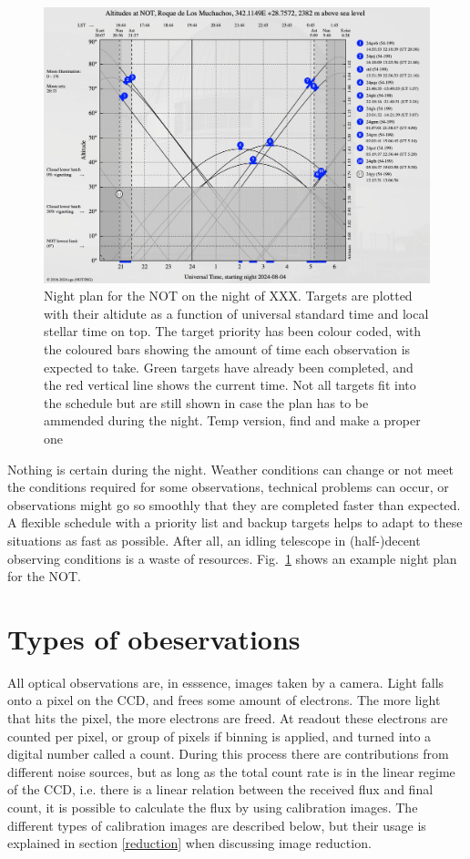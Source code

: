\documentclass[a4paper,oneside,12pt, class=Latex/Classes/PhDthesisPSnPDF, crop=false]{standalone}
\begin{document}
\begin{figure}
    \centering
    \includegraphics[width=\textwidth]{../Images/chapter_2/visplot.png}
    \caption{Night plan for the NOT on the night of XXX. Targets are plotted with their altidute as a function of universal standard time and local stellar time on top. The target priority has been colour coded, with the coloured bars showing the amount of time each observation is expected to take. Green targets have already been completed, and the red vertical line shows the current time. Not all targets fit into the schedule but are still shown in case the plan has to be ammended during the night.\color{red} Temp version, find and make a proper one \color{black}}
    \label{visplot}
\end{figure}

Nothing is certain during the night. Weather conditions can change or not meet the conditions required for some observations, technical problems can occur, or observations might go so smoothly that they are completed faster than expected. A flexible schedule with a priority list and backup targets helps to adapt to these situations as fast as possible. After all, an idling telescope in (half-)decent observing conditions is a waste of resources. Fig.~\ref{visplot} shows an example night plan for the NOT.



\section{Types of obeservations}
All optical observations are, in esssence, images taken by a camera. Light falls onto a pixel on the CCD, and frees some amount of electrons. The more light that hits the pixel, the more electrons are freed. At readout these electrons are counted per pixel, or group of pixels if binning is applied, and turned into a digital number called a count. During this process there are contributions from different noise sources, but as long as the total count rate is in the linear regime of the CCD, i.e. there is a linear relation between the received flux and final count, it is possible to calculate the flux by using calibration images. The different types of calibration images are described below, but their usage is explained in section \ref{reduction} when discussing image reduction.
\end{document}
